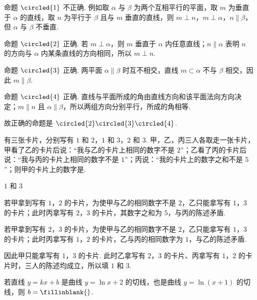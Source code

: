 \begin{solution}
命题 \(\circled{1}\) 不正确. 例如取 \(\alpha\) 与 \(\beta\) 为两个互相平行的平面，取 \(m\) 为垂直于 \(\alpha\) 的直线，取 \(n\) 为平行于 \(\beta\) 且与 \(m\) 垂直的直线，则 \(m\perp n\)，\(m\perp\alpha\)，\(n\parallel\beta\)，但 \(\alpha\) 与 \(\beta\) 不垂直.

命题 \(\circled{2}\) 正确. 若 \(m\perp\alpha\)，则 \(m\) 垂直于 \(\alpha\) 内任意直线；\(n\parallel\alpha\) 表明 \(n\) 的方向与 \(\alpha\) 内某条直线的方向相同，所以 \(m\perp n\).

命题 \(\circled{3}\) 正确. 两平面 \(\alpha\parallel\beta\) 时互不相交，直线 \(m\subset\alpha\) 不与 \(\beta\) 相交，因此 \(m\parallel\beta\).

命题 \(\circled{4}\) 正确. 直线与平面所成的角由直线方向和该平面法向方向决定；\(m\parallel n\) 且 \(\alpha\parallel\beta\)，所以两组方向分别平行，所成的角相等.

故正确的命题是 \(\circled{2}\circled{3}\circled{4}\).
\end{solution}


\begin{problem}
有三张卡片，分别写有 \(1\) 和 \(2\)，\(1\) 和 \(3\)，\(2\) 和 \(3\). 甲，乙，丙三人各取走一张卡片，甲看了乙的卡片后说：“我与乙的卡片上相同的数字不是 \(2\)”；乙看了丙的卡片后说：“我与丙的卡片上相同的数字不是 \(1\)”；丙说：“我的卡片上的数字之和不是 \(5\)”；则甲的卡片上的数字是\fillinblank{}.
\end{problem}

\begin{answer}
\(1\) 和 \(3\)
\end{answer}

\begin{solution}
若甲拿到写有 \(1\)，\(2\) 的卡片，为使甲与乙的相同数字不是 \(2\)，乙只能拿写有 \(1\)，\(3\) 的卡片；此时丙拿写有 \(2\)，\(3\) 的卡片，其数字之和为 \(5\)，与丙的陈述矛盾.

若甲拿到写有 \(2\)，\(3\) 的卡片，为使甲与乙的相同数字不是 \(2\)，乙只能拿写有 \(1\)，\(3\) 的卡片；此时丙拿写有 \(1\)，\(2\) 的卡片，乙与丙的相同数字为 \(1\)，与乙的陈述矛盾.

因此甲只能拿写有 \(1\)，\(3\) 的卡片. 此时乙拿写有 \(2\)，\(3\) 的卡片、丙拿写有 \(1\)，\(2\) 的卡片时，三人的陈述均成立，所以填 \(1\) 和 \(3\).
\end{solution}


\begin{problem}
若直线 \(y=kx+b\) 是曲线 \(y=\ln x+2\) 的切线，也是曲线 \(y=\ln(x+1)\) 的切线，则 \(b=\fillinblank{}\).
\end{problem}

